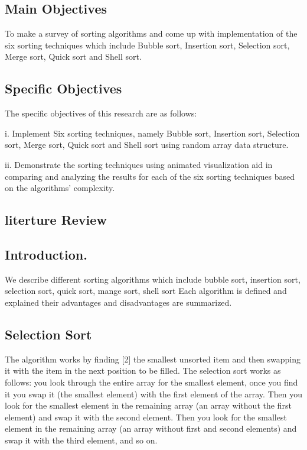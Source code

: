 \documentclass{article}
\begin{document}
\subsection*{Main Objectives}
	To make a survey of sorting algorithms and come up with implementation of the six sorting techniques which include  Bubble sort, Insertion sort, Selection sort, Merge sort, Quick sort and Shell sort.

\subsection*{Specific Objectives}
	The specific objectives of this research are as follows:
		\begin{list}{}
			\item i. Implement Six sorting techniques, namely Bubble sort, Insertion sort, Selection sort, Merge sort, Quick sort and Shell sort using random array data structure.
			\item ii. Demonstrate the sorting techniques using animated visualization aid in comparing and analyzing the results for each of the six sorting techniques based on the algorithms’ complexity.
		\end{list}

\subsection{literture Review}

\subsection{Introduction.}
We describe different sorting algorithms which include bubble sort, insertion sort, selection sort, quick sort, mange sort, shell sort  Each algorithm is defined and explained their advantages and disadvantages are summarized.

\subsection{Selection Sort}
The algorithm works by finding [2] the smallest unsorted item and then swapping it with the item in the next position to be filled. The selection sort works as follows: you look through the entire array for the smallest element, once you find it you swap it (the smallest element) with the first element of the array. Then you look for the smallest element in the remaining array (an array without the first element) and swap it with the second element. Then you look for the smallest element in the remaining array (an array without first and second elements) and swap it with the third element, and so on.
\end{document}

